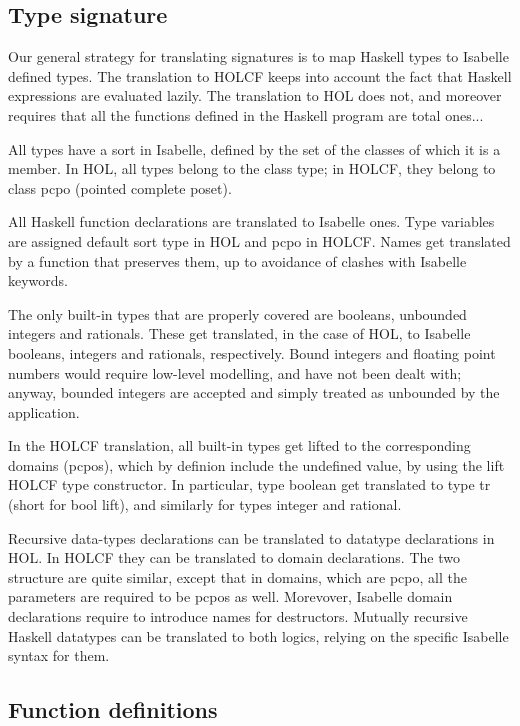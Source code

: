 \documentclass[a4paper,12pt]{article}
\begin{document}
\subsection*{Type signature}

Our general strategy for translating signatures is to map Haskell
types to Isabelle defined types. The translation to HOLCF keeps into
account the fact that Haskell expressions are evaluated lazily. The
translation to HOL does not, and moreover requires that all the
functions defined in the Haskell program are total ones...

All types have a sort in Isabelle, defined by the set of the classes
of which it is a member. In HOL, all types belong to the class type;
in HOLCF, they belong to class pcpo (pointed complete poset).

All Haskell function declarations are translated to Isabelle ones.
Type variables are assigned default sort type in HOL and pcpo in
HOLCF.  Names get translated by a function that preserves them, up to
avoidance of clashes with Isabelle keywords.

The only built-in types that are properly covered are booleans,
unbounded integers and rationals. These get translated, in the case of
HOL, to Isabelle booleans, integers and rationals, respectively. Bound
integers and floating point numbers would require low-level modelling,
and have not been dealt with; anyway, bounded integers are accepted
and simply treated as unbounded by the application.

In the HOLCF translation, all built-in types get lifted to the
corresponding domains (pcpos), which by definion include the undefined
value, by using the lift HOLCF type constructor. In particular, type
boolean get translated to type tr (short for bool lift), and similarly
for types integer and rational.

Recursive data-types declarations can be translated to datatype
declarations in HOL. In HOLCF they can be translated to domain
declarations. The two structure are quite similar, except that in
domains, which are pcpo, all the parameters are required to be pcpos
as well. Morevover, Isabelle domain declarations require to introduce
names for destructors. Mutually recursive Haskell datatypes can be
translated to both logics, relying on the specific Isabelle syntax for
them.


\subsection*{Function definitions}
\end{document}
